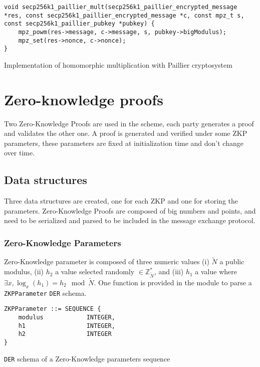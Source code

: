 \begin{listing}
  \begin{verbatim}
void secp256k1_paillier_mult(secp256k1_paillier_encrypted_message *res, const secp256k1_paillier_encrypted_message *c, const mpz_t s, const secp256k1_paillier_pubkey *pubkey) {
    mpz_powm(res->message, c->message, s, pubkey->bigModulus);
    mpz_set(res->nonce, c->nonce);
}
  \end{verbatim}
	\caption{Implementation of homomorphic multiplication with Paillier cryptosystem}
	\label{lst:implHomomorphMulPaillier}
\end{listing}


\section{Zero-knowledge proofs}

Two Zero-Knowledge Proofs are used in the scheme, each party generates a proof
and validates the other one. A proof is generated and verified under some ZKP
parameters, these parameters are fixed at initialization time and don't
change over time.

\subsection{Data structures}

Three data structures are created, one for each ZKP and one for storing the
parameters. Zero-Knowledge Proofs are composed of big numbers and points, and
need to be serialized and parsed to be included in the message exchange
protocol.

\subsubsection{Zero-Knowledge Parameters}

Zero-Knowledge parameter is composed of three numeric values (i) $\tilde{N}$ a
public modulus, (ii) $h_2$ a value selected randomly $\in
\mathbb{Z}_{\tilde{N}}^*$, and (iii) $h_1$ a value where $\exists x, \log_x(h_1) =
h_2 \mod \tilde{N}$. One function is provided in the module to parse a
\texttt{ZKPParameter} \texttt{DER} schema.

\begin{listing}
  \begin{verbatim}
ZKPParameter ::= SEQUENCE {
    modulus            INTEGER,
    h1                 INTEGER,
    h2                 INTEGER
}
  \end{verbatim}
	\caption{\texttt{DER} schema of a Zero-Knowledge parameters sequence}
	\label{lst:DERSchemaZKPParams}
\end{listing}


